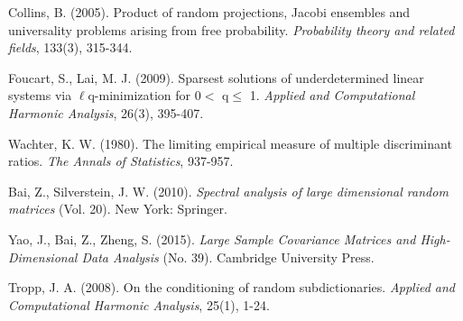 \documentclass[a4paper,12pt]{article}
\begin{document}
\begin{thebibliography}{1}
 Collins, B. (2005). Product of random projections, Jacobi ensembles and universality problems arising from free probability. \emph{Probability theory and related fields}, 133(3), 315-344.




 Foucart, S., Lai, M. J. (2009). Sparsest solutions of underdetermined linear systems via $\ell$q-minimization for 0$<$ q$\leqslant$ 1. \emph{Applied and Computational Harmonic Analysis}, 26(3), 395-407.


 Wachter, K. W. (1980). The limiting empirical measure of multiple discriminant ratios. \emph{The Annals of Statistics}, 937-957.


Bai, Z., Silverstein, J. W. (2010). \emph{Spectral analysis of large dimensional random matrices} (Vol. 20). New York: Springer.


 Yao, J., Bai, Z., Zheng, S. (2015). \emph{Large Sample Covariance Matrices and High-Dimensional Data Analysis} (No. 39). Cambridge University Press.


 Tropp, J. A. (2008). On the conditioning of random subdictionaries. \emph{Applied and Computational Harmonic Analysis}, 25(1), 1-24.


\end{thebibliography}
\end{document}
